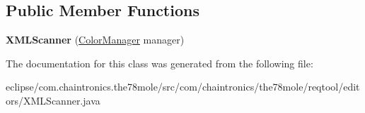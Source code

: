 \subsection*{Public Member Functions}
\begin{DoxyCompactItemize}
\item 
{\bfseries X\+M\+L\+Scanner} (\hyperlink{classcom_1_1chaintronics_1_1the78mole_1_1reqtool_1_1editors_1_1ColorManager}{Color\+Manager} manager)\hypertarget{classcom_1_1chaintronics_1_1the78mole_1_1reqtool_1_1editors_1_1XMLScanner_a6b5c375b032530c84fa9912a9134280c}{}\label{classcom_1_1chaintronics_1_1the78mole_1_1reqtool_1_1editors_1_1XMLScanner_a6b5c375b032530c84fa9912a9134280c}

\end{DoxyCompactItemize}


The documentation for this class was generated from the following file\+:\begin{DoxyCompactItemize}
\item 
eclipse/com.\+chaintronics.\+the78mole/src/com/chaintronics/the78mole/reqtool/editors/X\+M\+L\+Scanner.\+java\end{DoxyCompactItemize}
